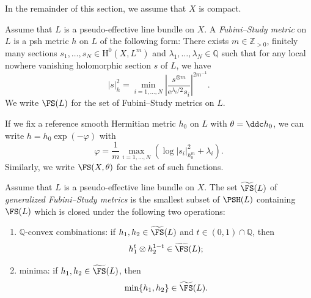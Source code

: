 In the remainder of this section, we assume that $X$ is compact.

\begin{definition}\label{def:ArcFSmetric}Assume that $L$ is a pseudo-effective line bundle on $X$.
    A \emph{Fubini--Study metric} on $L$ is a psh metric $h$ on $L$ of the following form: There exists $m\in \mathbb{Z}_{>0}$, finitely many sections $s_1,\ldots,s_N\in \mathrm{H}^0(X,L^m)$ and $\lambda_1,\ldots,\lambda_N\in \mathbb{Q}$ such that for any local nowhere vanishing holomorphic section $s$ of $L$, we have
    \[
    |s|_h^2=\min_{i=1,\ldots,N}\left| \frac{s^{\otimes m}}{\mathrm{e}^{\lambda_i/2}s_i}\right|^{2m^{-1}}.
    \]
    We write $\FS(L)$ for the set of Fubini--Study metrics on $L$.
\end{definition}
If we fix a reference smooth Hermitian metric $h_0$ on $L$ with $\theta=\ddc h_0$, we can write $h=h_0\exp(-\varphi)$ with
\[
\varphi=\frac{1}{m}\max_{i=1,\ldots,N}\left(\log |s_i|^2_{h_0^{m}}+\lambda_i\right).
\]
Similarly, we write $\FS(X,\theta)$ for the set of such functions.

\begin{definition}\label{def:gFSmetric}
Assume that $L$ is a pseudo-effective line bundle on $X$.
    The set $\widetilde{\FS}(L)$ of \emph{generalized Fubini--Study metrics} is the smallest subset of $\PSH(L)$ containing $\FS(L)$ which is closed under the following two operations:
    \begin{enumerate}
        \item\label{itm:def:gFSmetric:1} $\mathbb{Q}$-convex combinations: if $h_1,h_2\in \widetilde{\FS}(L)$ and $t\in (0,1)\cap\mathbb{Q}$, then
        \[
        h_1^t \otimes h_2^{1-t}\in \widetilde{\FS}(L);
        \]
        \item\label{itm:def:gFSmetric:2} minima: if $h_1,h_2\in \widetilde{\FS}(L)$, then
        \[
        \min\{h_1,h_2\}\in \widetilde{\FS}(L).
        \]
    \end{enumerate}
\end{definition}


